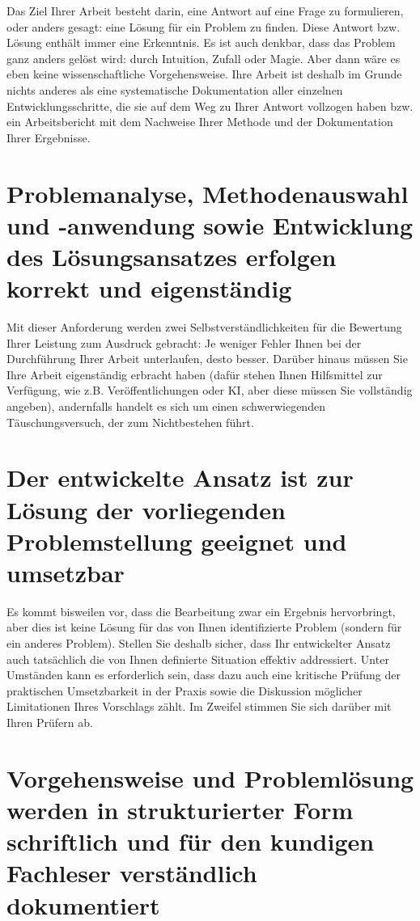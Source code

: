 Das Ziel Ihrer Arbeit besteht darin, eine Antwort auf eine Frage zu formulieren, oder anders gesagt: eine Lösung für ein Problem zu finden. Diese Antwort bzw. Lösung enthält immer eine Erkenntnis. Es ist auch denkbar, dass das Problem ganz anders gelöst wird: durch Intuition, Zufall oder Magie. Aber dann wäre es eben keine wissenschaftliche Vorgehensweise. Ihre Arbeit ist deshalb im Grunde nichts anderes als eine systematische Dokumentation aller einzelnen Entwicklungsschritte, die sie auf dem Weg zu Ihrer Antwort vollzogen haben bzw. ein Arbeitsbericht mit dem Nachweise Ihrer Methode und der Dokumentation Ihrer Ergebnisse.

\section{Problemanalyse, Methodenauswahl und -anwendung sowie Entwicklung des Lösungsansatzes erfolgen korrekt und eigenständig}
\label{sec:korrekte-eigenstaendige-durchfuehrung}

Mit dieser Anforderung werden zwei Selbstverständlichkeiten für die Bewertung Ihrer Leistung zum Ausdruck gebracht: Je weniger Fehler Ihnen bei der Durchführung Ihrer Arbeit unterlaufen, desto besser. Darüber hinaus müssen Sie Ihre Arbeit eigenständig erbracht haben (dafür stehen Ihnen Hilfsmittel zur Verfügung, wie z.B. Veröffentlichungen oder KI, aber diese müssen Sie vollständig angeben), andernfalls handelt es sich um einen schwerwiegenden Täuschungsversuch, der zum Nichtbestehen führt.

\section{Der entwickelte Ansatz ist zur Lösung der vorliegenden Problemstellung geeignet und umsetzbar}
\label{sec:ansatz-geeignet}

Es kommt bisweilen vor, dass die Bearbeitung zwar ein Ergebnis hervorbringt, aber dies ist keine Lösung für das von Ihnen identifizierte Problem (sondern für ein anderes Problem). Stellen Sie deshalb sicher, dass Ihr entwickelter Ansatz auch tatsächlich die von Ihnen definierte Situation effektiv addressiert. Unter Umständen kann es erforderlich sein, dass dazu auch eine kritische Prüfung der praktischen Umsetzbarkeit in der Praxis sowie die Diskussion möglicher Limitationen Ihres Vorschlags zählt. Im Zweifel stimmen Sie sich darüber mit Ihren Prüfern ab.

\section{Vorgehensweise und Problemlösung werden in strukturierter Form schriftlich und für den kundigen Fachleser verständlich dokumentiert}
\label{sec:dokumentation}

